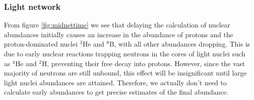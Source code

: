 \subsubsection{Light network}

From figure \ref{fig:midnettime} we see that delaying the calculation of nuclear abundances initially causes an increase in the abundance of protons and the proton-dominated nuclei ${}^3$He and ${}^8$B, with all other abundances dropping. This is due to early nuclear reactions trapping neutrons in the cores of light nuclei such as ${}^4$He and ${}^2$H, preventing their free decay into protons. However, since the vast majority of neutrons are still unbound, this effect will be insignificant until large light nuclei abundances are attained. Therefore, we actually don't need to calculate early abundances to get precise estimates of the final abundance. 

